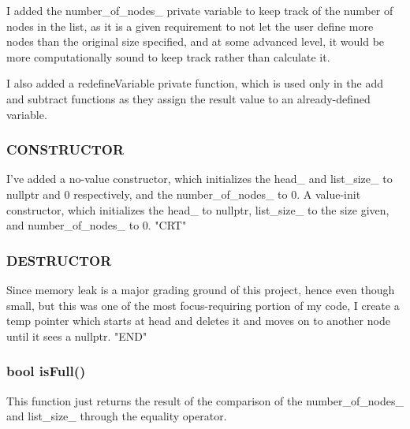 \documentclass[a4paper]{article}
\begin{document}
    I added the {\color{LimeGreen}number\_of\_nodes\_} private variable to keep 
    track of the number of nodes in the list, as it is a given requirement 
    to not let the user define more nodes than the original size specified, 
    and at some advanced level, it would be more computationally sound to keep 
    track rather than calculate it.

    I also added a redefineVariable private function, which is 
    used only in the add and subtract functions as they assign the result value 
    to an already-defined variable.
    \subsubsection{\color{draculapurple}CONSTRUCTOR}
    I've added a no-value constructor, which initializes the {\color{LimeGreen}head\_} and 
    {\color{LimeGreen}list\_size\_} to nullptr and 0 respectively, and the {\color{LimeGreen}number\_of\_nodes\_} to 0.
    A value-init constructor, which initializes the {\color{LimeGreen}head\_} to nullptr, 
    {\color{LimeGreen}list\_size\_} to the size given, and {\color{LimeGreen}number\_of\_nodes\_} to 0. "CRT"
    \subsubsection{\color{draculapurple}DESTRUCTOR}
    Since memory leak is a major grading ground of this project, 
    hence even though small, but this was one of the most focus-requiring 
    portion of my code, I create a temp pointer which starts at head and deletes 
    it and moves on to another node until it sees a {\color{LightPink}nullptr}. "END"
    \subsubsection{{\color{orange}bool} {\color{draculapurple}isFull}()}
    This function just returns the result of the comparison of the 
    {\color{LimeGreen}number\_of\_nodes\_} and {\color{LimeGreen}list\_size\_} through the equality operator.
\end{document}
